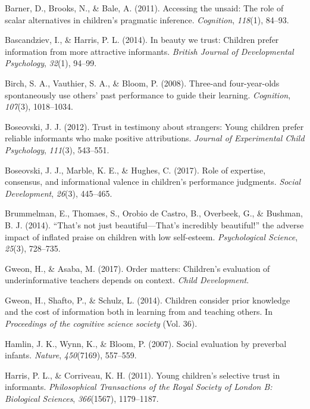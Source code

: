 \documentclass[10pt, letterpaper]{article}
\begin{document}
\setlength{\parindent}{-0.1in} \setlength{\leftskip}{0.125in} \noindent

\hypertarget{refs}{}
\hypertarget{ref-barner2011accessing}{}
Barner, D., Brooks, N., \& Bale, A. (2011). Accessing the unsaid: The
role of scalar alternatives in children's pragmatic inference.
\emph{Cognition}, \emph{118}(1), 84--93.

\hypertarget{ref-bascandziev2014beauty}{}
Bascandziev, I., \& Harris, P. L. (2014). In beauty we trust: Children
prefer information from more attractive informants. \emph{British
Journal of Developmental Psychology}, \emph{32}(1), 94--99.

\hypertarget{ref-birch2008three}{}
Birch, S. A., Vauthier, S. A., \& Bloom, P. (2008). Three-and
four-year-olds spontaneously use others' past performance to guide their
learning. \emph{Cognition}, \emph{107}(3), 1018--1034.

\hypertarget{ref-boseovski2012trust}{}
Boseovski, J. J. (2012). Trust in testimony about strangers: Young
children prefer reliable informants who make positive attributions.
\emph{Journal of Experimental Child Psychology}, \emph{111}(3),
543--551.

\hypertarget{ref-boseovski2017role}{}
Boseovski, J. J., Marble, K. E., \& Hughes, C. (2017). Role of
expertise, consensus, and informational valence in children's
performance judgments. \emph{Social Development}, \emph{26}(3),
445--465.

\hypertarget{ref-brummelman2014s}{}
Brummelman, E., Thomaes, S., Orobio de Castro, B., Overbeek, G., \&
Bushman, B. J. (2014). ``That's not just beautiful---That's incredibly
beautiful!'' the adverse impact of inflated praise on children with low
self-esteem. \emph{Psychological Science}, \emph{25}(3), 728--735.

\hypertarget{ref-gweon2017order}{}
Gweon, H., \& Asaba, M. (2017). Order matters: Children's evaluation of
underinformative teachers depends on context. \emph{Child Development}.

\hypertarget{ref-gweon2014children}{}
Gweon, H., Shafto, P., \& Schulz, L. (2014). Children consider prior
knowledge and the cost of information both in learning from and teaching
others. In \emph{Proceedings of the cognitive science society} (Vol.
36).

\hypertarget{ref-hamlin2007social}{}
Hamlin, J. K., Wynn, K., \& Bloom, P. (2007). Social evaluation by
preverbal infants. \emph{Nature}, \emph{450}(7169), 557--559.

\hypertarget{ref-harris2011young}{}
Harris, P. L., \& Corriveau, K. H. (2011). Young children's selective
trust in informants. \emph{Philosophical Transactions of the Royal
Society of London B: Biological Sciences}, \emph{366}(1567), 1179--1187.
\end{document}

